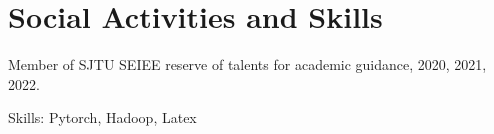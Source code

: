 \documentclass[letterpaper,12pt]{article}
\begin{document}
\vspace{-5pt}
{\color{DarkBlue}\section {Social Activities and Skills}}  
 \begin{itemize}[leftmargin=0.15in]
\small{\item Member of SJTU SEIEE reserve of talents for academic guidance, 2020, 2021, 2022.}\vspace{-5pt}
\small{\item Skills: Pytorch, Hadoop, Latex}
\end{itemize}
\end{document}
